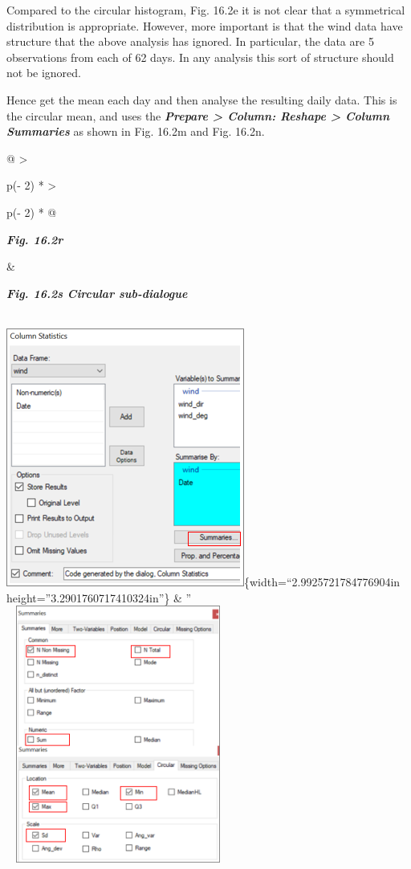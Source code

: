 \documentclass[
  letterpaper,
  DIV=11,
  numbers=noendperiod]{scrreprt}
\begin{document}
Compared to the circular histogram, Fig. 16.2e it is not clear that a
symmetrical distribution is appropriate. However, more important is that
the wind data have structure that the above analysis has ignored. In
particular, the data are 5 observations from each of 62 days. In any
analysis this sort of structure should not be ignored.

Hence get the mean each day and then analyse the resulting daily data.
This is the circular mean, and uses the \textbf{\emph{Prepare
\textgreater{} Column: Reshape \textgreater{} Column Summaries}} as
shown in Fig. 16.2m and Fig. 16.2n.

\begin{longtable}[]{@{}
  >{\raggedright\arraybackslash}p{(\columnwidth - 2\tabcolsep) * }
  >{\raggedright\arraybackslash}p{(\columnwidth - 2\tabcolsep) * }@{}}
\toprule\noalign{}
\begin{minipage}[b]{\linewidth}\raggedright
\textbf{\emph{Fig. 16.2r}}
\end{minipage} & \begin{minipage}[b]{\linewidth}\raggedright
\textbf{\emph{Fig. 16.2s Circular sub-dialogue}}
\end{minipage} \\
\midrule\noalign{}
\endhead
\bottomrule\noalign{}
\endlastfoot
\includegraphics{figures/Fig16.2r.png}\{width=``2.9925721784776904in
height=''3.2901760717410324in''\} & ''
\includegraphics[width=2.90208in,height=3.33472in]{figures/Fig16.2s.png} \\
\end{longtable}
\end{document}
